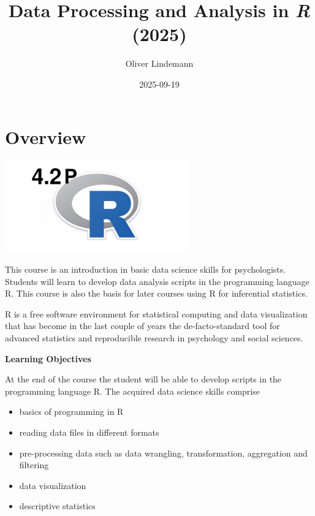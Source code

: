 \documentclass[
]{scrartcl}
\title{Data Processing and Analysis in \emph{R} (2025)}
\author{Oliver Lindemann}
\date{2025-09-19}
\providecommand{\tightlist}{%
  \setlength{\itemsep}{0pt}\setlength{\parskip}{0pt}}
\begin{document}
\maketitle

{
\setcounter{tocdepth}{2}
\tableofcontents
}
\newpage

\section*{Overview}\label{overview}

\begin{center}\includegraphics[width=300px]{images/R-course-logo} \end{center}

This course is an introduction in basic data science skills for psychologists. Students will learn to develop data analysis scripts in the programming language R. This course is also the basis for later courses using R for inferential statistics.

R is a free software environment for statistical computing and data visualization that has become in the last couple of years the de-facto-standard tool for advanced statistics and reproducible research in psychology and social sciences.

\textbf{Learning Objectives}

At the end of the course the student will be able to develop scripts in the programming language R. The acquired data science skills comprise

\begin{itemize}
\tightlist
\item
  basics of programming in R
\item
  reading data files in different formats
\item
  pre-processing data such as data wrangling, transformation, aggregation and filtering
\item
  data visualization
\item
  descriptive statistics
\end{itemize}
\end{document}
